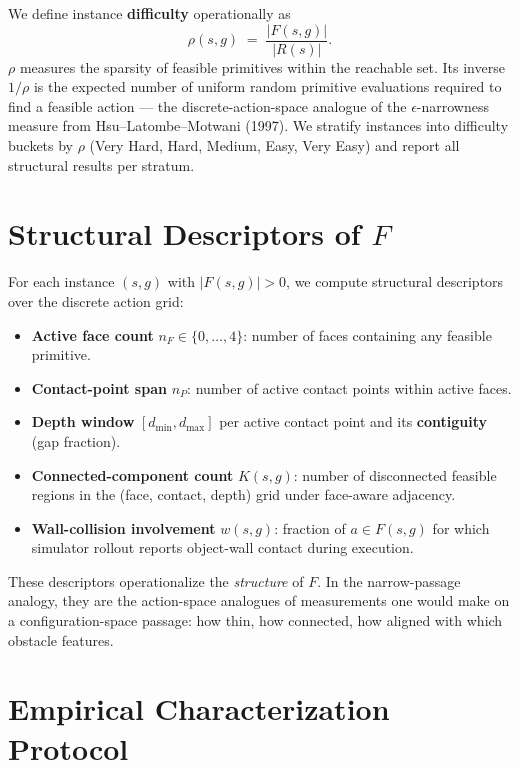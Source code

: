\documentclass[11pt]{article}
\begin{document}
We define instance \textbf{difficulty} operationally as
\[
  \rho(s, g) \;=\; \frac{|F(s, g)|}{|R(s)|}.
\]
$\rho$ measures the sparsity of feasible primitives within the reachable set.
Its inverse $1/\rho$ is the expected number of uniform random primitive
evaluations required to find a feasible action --- the discrete-action-space
analogue of the $\epsilon$-narrowness measure from Hsu--Latombe--Motwani
(1997). We stratify instances into difficulty buckets by $\rho$ (Very Hard,
Hard, Medium, Easy, Very Easy) and report all structural results per stratum.

\section{Structural Descriptors of $F$}\label{sec:descriptors}

For each instance $(s, g)$ with $|F(s, g)| > 0$, we compute structural
descriptors over the discrete action grid:
\begin{itemize}[leftmargin=2em,itemsep=0pt]
  \item \textbf{Active face count} $n_F \in \{0,\dots,4\}$: number of faces
        containing any feasible primitive.
  \item \textbf{Contact-point span} $n_P$: number of active contact points
        within active faces.
  \item \textbf{Depth window} $[d_{\min}, d_{\max}]$ per active contact point
        and its \textbf{contiguity} (gap fraction).
  \item \textbf{Connected-component count} $K(s, g)$: number of disconnected
        feasible regions in the (face, contact, depth) grid under face-aware
        adjacency.
  \item \textbf{Wall-collision involvement} $w(s, g)$: fraction of
        $a \in F(s, g)$ for which simulator rollout reports object-wall
        contact during execution.
\end{itemize}

These descriptors operationalize the \emph{structure} of $F$. In the
narrow-passage analogy, they are the action-space analogues of measurements
one would make on a configuration-space passage: how thin, how connected, how
aligned with which obstacle features.

\section{Empirical Characterization Protocol}
\end{document}
